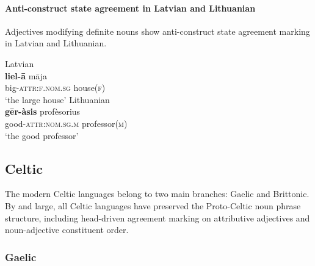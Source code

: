 \paragraph{Anti-construct state agreement in Latvian and Lithuanian}
Adjectives modifying definite nouns show anti-construct state agreement marking in Latvian and Lithuanian.
\begin{exe}
\ex 
\begin{xlist}	
\ex \rm{Latvian \citep[example from][115]{dahl2007}}\\
\gll 	\textbf{liel-ā} māja\\
	big-\textsc{attr:f.nom.sg} house(\textsc{f})\\
\glt	‘the large house’
\ex \rm{Lithuanian \citep[13]{bechert1993}}\\
\gll 	\textbf{gēr-àsis}		profèsorius\\
	good-\textsc{attr:nom.sg.m}	professor(\textsc{m})\\
\glt	‘the good professor’
\end{xlist}
\end{exe}

\subsection{Celtic}
The modern Celtic languages belong to two main branches: Gaelic and Brittonic. By and large, all Celtic languages have preserved the Proto-Celtic noun phrase structure, including head-driven agreement marking on attributive adjectives and noun-adjective constituent order.

\subsubsection{Gaelic}
